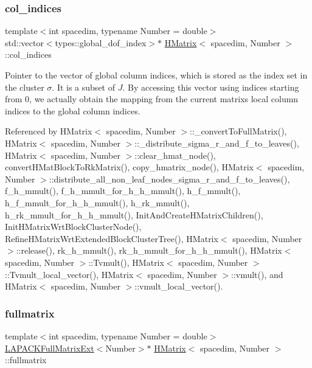 \subsubsection{\texorpdfstring{col\+\_\+indices}{col\_indices}}
{\footnotesize\ttfamily template$<$int spacedim, typename Number = double$>$ \\
std\+::vector$<$types\+::global\+\_\+dof\+\_\+index$>$$\ast$ \hyperlink{classHMatrix}{H\+Matrix}$<$ spacedim, Number $>$\+::col\+\_\+indices\hspace{0.3cm}{\ttfamily [private]}}

Pointer to the vector of global column indices, which is stored as the index set in the cluster $\sigma$. It is a subset of $J$. By accessing this vector using indices starting from 0, we actually obtain the mapping from the current matrix\textquotesingle{}s local column indices to the global column indices. 

Referenced by H\+Matrix$<$ spacedim, Number $>$\+::\+\_\+convert\+To\+Full\+Matrix(), H\+Matrix$<$ spacedim, Number $>$\+::\+\_\+distribute\+\_\+sigma\+\_\+r\+\_\+and\+\_\+f\+\_\+to\+\_\+leaves(), H\+Matrix$<$ spacedim, Number $>$\+::clear\+\_\+hmat\+\_\+node(), convert\+H\+Mat\+Block\+To\+Rk\+Matrix(), copy\+\_\+hmatrix\+\_\+node(), H\+Matrix$<$ spacedim, Number $>$\+::distribute\+\_\+all\+\_\+non\+\_\+leaf\+\_\+nodes\+\_\+sigma\+\_\+r\+\_\+and\+\_\+f\+\_\+to\+\_\+leaves(), f\+\_\+h\+\_\+mmult(), f\+\_\+h\+\_\+mmult\+\_\+for\+\_\+h\+\_\+h\+\_\+mmult(), h\+\_\+f\+\_\+mmult(), h\+\_\+f\+\_\+mmult\+\_\+for\+\_\+h\+\_\+h\+\_\+mmult(), h\+\_\+rk\+\_\+mmult(), h\+\_\+rk\+\_\+mmult\+\_\+for\+\_\+h\+\_\+h\+\_\+mmult(), Init\+And\+Create\+H\+Matrix\+Children(), Init\+H\+Matrix\+Wrt\+Block\+Cluster\+Node(), Refine\+H\+Matrix\+Wrt\+Extended\+Block\+Cluster\+Tree(), H\+Matrix$<$ spacedim, Number $>$\+::release(), rk\+\_\+h\+\_\+mmult(), rk\+\_\+h\+\_\+mmult\+\_\+for\+\_\+h\+\_\+h\+\_\+mmult(), H\+Matrix$<$ spacedim, Number $>$\+::\+Tvmult(), H\+Matrix$<$ spacedim, Number $>$\+::\+Tvmult\+\_\+local\+\_\+vector(), H\+Matrix$<$ spacedim, Number $>$\+::vmult(), and H\+Matrix$<$ spacedim, Number $>$\+::vmult\+\_\+local\+\_\+vector().

\mbox{\label{classHMatrix_a328134c9e9cb2c4b05d5431c0ca8a533}} 
\subsubsection{\texorpdfstring{fullmatrix}{fullmatrix}}
{\footnotesize\ttfamily template$<$int spacedim, typename Number = double$>$ \\
\hyperlink{classLAPACKFullMatrixExt}{L\+A\+P\+A\+C\+K\+Full\+Matrix\+Ext}$<$Number$>$$\ast$ \hyperlink{classHMatrix}{H\+Matrix}$<$ spacedim, Number $>$\+::fullmatrix\hspace{0.3cm}{\ttfamily [private]}}

